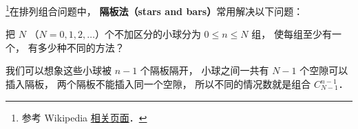 

\footnote{参考 Wikipedia \href{https://en.wikipedia.org/wiki/Stars_and_bars_(combinatorics)}{相关页面}．}在排列组合问题中， \textbf{隔板法（stars and bars）}常用解决以下问题：

把 $N$ （$N = 0,1,2,\dots$）个不加区分的小球分为 $0\leqslant n\leqslant N$ 组， 使每组至少有一个， 有多少种不同的方法？

我们可以想象这些小球被 $n-1$ 个隔板隔开， 小球之间一共有 $N-1$ 个空隙可以插入隔板， 两个隔板不能插入同一个空隙， 所以不同的情况数就是组合 $C_{N-1}^{n-1}$．
